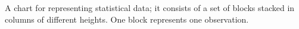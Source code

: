  A chart for representing statistical data; it consists of a
set of blocks stacked in columns of different heights. One block
represents one observation.
